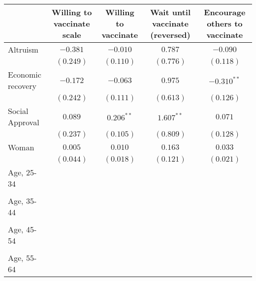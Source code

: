 \begin{table}
\begin{center}
\begin{tabular}{l c c c c}
\hline
 & Willing to vaccinate scale & Willing to vaccinate & Wait until vaccinate (reversed) & Encourage others to vaccinate \\
\hline
Altruism                                            & $-0.381$       & $-0.010$      & $0.787$       & $-0.090$      \\
                                                    & $(0.249)$      & $(0.110)$     & $(0.776)$     & $(0.118)$     \\
Economic recovery                                   & $-0.172$       & $-0.063$      & $0.975$       & $-0.310^{**}$ \\
                                                    & $(0.242)$      & $(0.111)$     & $(0.613)$     & $(0.126)$     \\
Social Approval                                     & $0.089$        & $0.206^{**}$  & $1.607^{**}$  & $0.071$       \\
                                                    & $(0.237)$      & $(0.105)$     & $(0.809)$     & $(0.128)$     \\
Woman                                               & $0.005$        & $0.010$       & $0.163$       & $0.033$       \\
                                                    & $(0.044)$      & $(0.018)$     & $(0.121)$     & $(0.021)$     \\
Age, 25-34                                          &                &               &               &               \\
                                                    &                &               &               &               \\
Age, 35-44                                          &                &               &               &               \\
                                                    &                &               &               &               \\
Age, 45-54                                          &                &               &               &               \\
                                                    &                &               &               &               \\
Age, 55-64                                          &                &               &               &               \\

\end{tabular}
\end{center}
\end{table}
